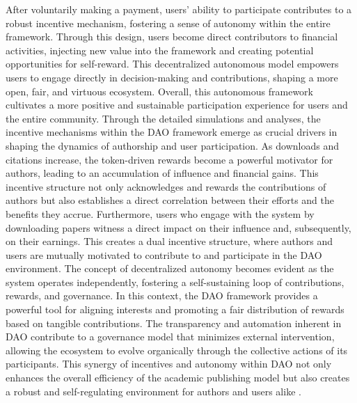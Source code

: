 \documentclass[lettersize,journal]{IEEEtran}
\begin{document}
After voluntarily making a payment, users' ability to participate contributes to a robust incentive mechanism, fostering a sense of autonomy within the entire framework. Through this design, users become direct contributors to financial activities, injecting new value into the framework and creating potential opportunities for self-reward. This decentralized autonomous model empowers users to engage directly in decision-making and contributions, shaping a more open, fair, and virtuous ecosystem. Overall, this autonomous framework cultivates a more positive and sustainable participation experience for users and the entire community.
Through the detailed simulations and analyses, the incentive mechanisms within the DAO framework emerge as crucial drivers in shaping the dynamics of authorship and user participation. As downloads and citations increase, the token-driven rewards become a powerful motivator for authors, leading to an accumulation of influence and financial gains. This incentive structure not only acknowledges and rewards the contributions of authors but also establishes a direct correlation between their efforts and the benefits they accrue.
Furthermore, users who engage with the system by downloading papers witness a direct impact on their influence and, subsequently, on their earnings. This creates a dual incentive structure, where authors and users are mutually motivated to contribute to and participate in the DAO environment. The concept of decentralized autonomy becomes evident as the system operates independently, fostering a self-sustaining loop of contributions, rewards, and governance.
In this context, the DAO framework provides a powerful tool for aligning interests and promoting a fair distribution of rewards based on tangible contributions. The transparency and automation inherent in DAO contribute to a governance model that minimizes external intervention, allowing the ecosystem to evolve organically through the collective actions of its participants. This synergy of incentives and autonomy within DAO not only enhances the overall efficiency of the academic publishing model but also creates a robust and self-regulating environment for authors and users alike \cite{ostrom1990governing}.
\end{document}
